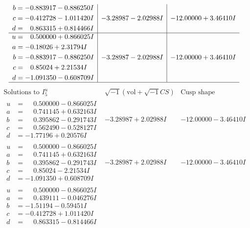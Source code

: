 \documentclass[1p]{elsarticle_modified}
\theoremstyle{definition}
\newcommand{\I}{\sqrt{-1}}
\begin{document}
$$\begin{array}{c|c|c}
\begin{aligned}
b &= -0.883917 - 0.886250 I \\
c &= -0.412728 - 1.011420 I \\
d &= \phantom{-}0.863315 + 0.814466 I\end{aligned}
 & -3.28987 - 2.02988 I & -12.00000 + 3.46410 I \\ \hline\begin{aligned}
u &= \phantom{-}0.500000 + 0.866025 I \\
a &= -0.18026 + 2.31794 I \\
b &= -0.883917 - 0.886250 I \\
c &= \phantom{-}0.85024 + 2.21534 I \\
d &= -1.091350 - 0.608709 I\end{aligned}
 & -3.28987 - 2.02988 I & -12.00000 + 3.46410 I\\
 \hline 
 \end{array}$$\newpage$$\begin{array}{c|c|c}  
\text{Solutions to }I^u_{5}& \I (\text{vol} + \sqrt{-1}CS) & \text{Cusp shape}\\
 \hline 
\begin{aligned}
u &= \phantom{-}0.500000 - 0.866025 I \\
a &= \phantom{-}0.741145 + 0.632163 I \\
b &= \phantom{-}0.395862 - 0.291743 I \\
c &= \phantom{-}0.562490 - 0.528127 I \\
d &= -1.77196 + 0.20576 I\end{aligned}
 & -3.28987 + 2.02988 I & -12.00000 - 3.46410 I \\ \hline\begin{aligned}
u &= \phantom{-}0.500000 - 0.866025 I \\
a &= \phantom{-}0.741145 + 0.632163 I \\
b &= \phantom{-}0.395862 - 0.291743 I \\
c &= \phantom{-}0.85024 - 2.21534 I \\
d &= -1.091350 + 0.608709 I\end{aligned}
 & -3.28987 + 2.02988 I & -12.00000 - 3.46410 I \\ \hline\begin{aligned}
u &= \phantom{-}0.500000 - 0.866025 I \\
a &= \phantom{-}0.439111 - 0.046276 I \\
b &= -1.51194 - 0.59451 I \\
c &= -0.412728 + 1.011420 I \\
d &= \phantom{-}0.863315 - 0.814466 I\end{aligned}

\end{array}$$
\end{document}
